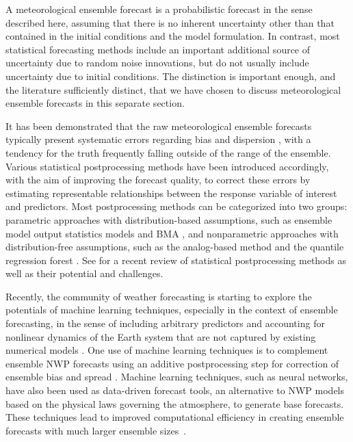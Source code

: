 \documentclass[a4paper,11pt]{article}
\begin{document}
A meteorological ensemble forecast is a probabilistic forecast in the sense described here, assuming that there is no inherent uncertainty other than that contained in the initial conditions and the model formulation. In contrast, most statistical forecasting methods include an important additional source of uncertainty due to random noise innovations, but do not usually include uncertainty due to initial conditions. The distinction is important enough, and the literature sufficiently distinct, that we have chosen to discuss meteorological ensemble forecasts in this separate section.

It has been demonstrated that the raw meteorological ensemble forecasts typically present systematic errors regarding bias \citep{Atger2003-lx,Mass2003-bc} and dispersion \citep{Buizza2005-wf,Sloughter2010-ae}, with a tendency for the truth frequently falling outside of the range of the ensemble. Various statistical postprocessing methods have been introduced accordingly, with the aim of improving the forecast quality, to correct these errors by estimating representable relationships between the response variable of interest and predictors. Most postprocessing methods can be categorized into two groups: parametric approaches with distribution-based assumptions, such as ensemble model output statistics \citep[EMOS,][]{Gneiting2005-ua} models and BMA \citep{Raftery2005-vu}, and nonparametric approaches with distribution-free assumptions, such as the analog-based method \citep[e.g.,][]{Delle_Monache2013-os} and the quantile regression forest \citep{Taillardat2019-ni}. See \citet{Vannitsem2021-bg} for a recent review of statistical postprocessing methods as well as their potential and challenges.

Recently, the community of weather forecasting is starting to explore the potentials of machine learning techniques, especially in the context of ensemble forecasting, in the sense of including arbitrary predictors and accounting for nonlinear dynamics of the Earth system that are not captured by existing numerical models \citep{Dueben2021-fe}. One use of machine learning techniques is to complement ensemble NWP \citep[numerical weather prediction, see, e.g.,][for a summary of its revolution]{Bauer2015-dg,Benjamin2019-zp} forecasts using an additive postprocessing step for correction of ensemble bias and spread \citep{Rasp2018-zu,Scher2018-dm,Gronquist2021-no}. Machine learning techniques, such as neural networks, have also been used as data-driven forecast tools, an alternative to NWP models based on the physical laws governing the atmosphere, to generate base forecasts. These techniques lead to improved computational efficiency in creating ensemble forecasts with much larger ensemble sizes~\citep{Dueben2018-ln,Scher2018-of,Rasp2021-az,Scher2021-ee}.
\end{document}
